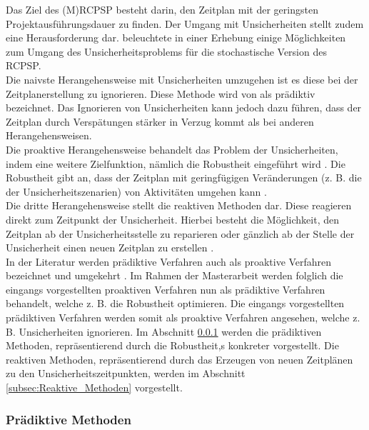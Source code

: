 Das Ziel des (M)RCPSP besteht darin, den Zeitplan mit der geringsten Projektausführungsdauer zu finden. Der Umgang mit Unsicherheiten stellt zudem eine Herausforderung dar. \cite{brcic_resource_2012} beleuchtete in einer Erhebung einige Möglichkeiten zum Umgang des Unsicherheitsproblems für die stochastische Version des RCPSP. \\

Die naivste Herangehensweise mit Unsicherheiten umzugehen ist es diese bei der Zeitplanerstellung zu ignorieren. Diese Methode wird von \cite{brcic_resource_2012} als prädiktiv bezeichnet. Das Ignorieren von Unsicherheiten kann jedoch dazu führen, dass der Zeitplan durch Verspätungen stärker in Verzug kommt als bei anderen Herangehensweisen. \cite[vgl.][S. 404]{brcic_resource_2012} \\

Die proaktive Herangehensweise behandelt das Problem der Unsicherheiten, indem eine weitere Zielfunktion, nämlich die Robustheit eingeführt wird \cite[vgl.][S. 404]{brcic_resource_2012}. Die Robustheit gibt an, dass der Zeitplan mit geringfügigen Veränderungen (z. B. die der Unsicherheitszenarien) von Aktivitäten umgehen kann \cite[vgl.][S. 246]{khemakhem_efficient_2013}. \\

Die dritte Herangehensweise stellt die reaktiven Methoden dar. Diese reagieren direkt zum Zeitpunkt der Unsicherheit. Hierbei besteht die Möglichkeit, den Zeitplan ab der Unsicherheitsstelle zu reparieren oder gänzlich ab der Stelle der Unsicherheit einen neuen Zeitplan zu erstellen \cite[vgl.][S. 404 f.]{brcic_resource_2012}.  \\

In der Literatur werden prädiktive Verfahren auch als proaktive Verfahren bezeichnet und umgekehrt \cite[vgl.][S. 246]{khemakhem_efficient_2013}. Im Rahmen der Masterarbeit werden folglich die eingangs vorgestellten proaktiven Verfahren nun als prädiktive Verfahren behandelt, welche z. B. die Robustheit optimieren. Die eingangs vorgestellten prädiktiven Verfahren werden somit als proaktive Verfahren angesehen, welche z. B. Unsicherheiten ignorieren. Im Abschnitt  \ref{subsec:Praediktive_Methoden} werden die prädiktiven Methoden, repräsentierend durch die Robustheit,s konkreter vorgestellt. Die reaktiven Methoden, repräsentierend durch das Erzeugen von neuen Zeitplänen zu den Unsicherheitszeitpunkten, werden im Abschnitt \ref{subsec:Reaktive_Methoden} vorgestellt.

\subsubsection{Prädiktive Methoden}
\label{subsec:Praediktive_Methoden}

